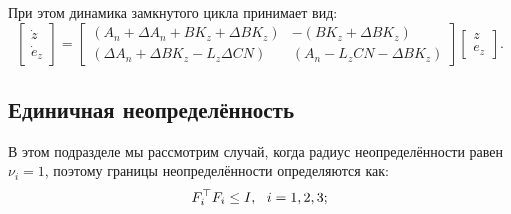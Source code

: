 %
При этом динамика замкнутого цикла принимает вид:
%
\begin{equation}
	\label{eq:part2_system}
	\begin{bmatrix}
		\dot{z} \\ \dot{e}_z
	\end{bmatrix}=\begin{bmatrix}
		({A}_n+\Delta {A}_n +{B}{K}_z+\Delta {B}{K}_z) & -({B}{K}_z+\Delta {B}{K}_z) \\
		(\Delta {A}_n +\Delta {B}{K}_z-{L}_z\Delta {C}{N}) & ({A}_n-{L}_z{C}{N}-\Delta {B}{K}_z)        \end{bmatrix}\begin{bmatrix}
		z \\ e_z
	\end{bmatrix}.
\end{equation}
%
\subsection{Единичная неопределённость}\label{sec:ch3/sect2/sub1}
В этом подразделе мы рассмотрим случай, когда радиус неопределённости равен $\nu_i = 1$, поэтому границы неопределённости определяются как:
%
\begin{equation}
	\label{eq:part2_one_uncertainty}
	{F}_i^\top{F}_i\leq {I}, \ \ i=1,2,3;
\end{equation}
%
